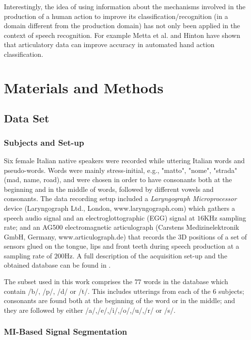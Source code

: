 \documentclass[10pt]{article}
\begin{document}
Interestingly, the idea of using information about the mechanisms involved in the production of a human action to improve its classification/recognition (in a domain different from the production domain) has not only been applied in the context of speech recognition. For example Metta et al. \cite{metta-06} and Hinton \cite{hinton-2006} 
have shown that articulatory data can improve accuracy in automated hand action classification.

\section*{Materials and Methods}\label{sec:methods}

\subsection*{Data Set}
\label{sec:dataset}

\subsubsection*{Subjects and Set-up}
\label{subsec:setup}

Six female Italian native speakers were recorded while uttering
Italian words and pseudo-words. Words were mainly stress-initial, e.g.,
"matto", "nome", "strada" (mad, name, road), and were chosen in order
to have consonants both at the beginning and in the middle of
words, followed by different vowels and consonants.
The data recording setup included a \emph{Laryngograph Microprocessor}
device (Laryngograph Ltd., London, www.laryngograph.com) which gathers a speech audio
signal and an electroglottographic (EGG) signal at $16$KHz sampling
rate; and an AG500 electromagnetic articulograph (Carstens Medizinelektronik
GmbH, Germany, www.articulograph.de) that records the
3D positions of a set of sensors glued on the tongue, lips and front teeth
during speech production at a sampling rate of $200$Hz. A full description of the 
acquisition set-up and the obtained database can be found in \cite{tavella}.

The subset used in this work comprises the $77$ words in the database
which contain /b/, /p/, /d/ or /t/. This includes utterings from each of the
$6$ subjects; consonants are found both at the beginning of the word or
in the middle; and they are followed by either /a/,/e/,/i/,/o/,/u/,/r/ or /s/.


\subsubsection*{MI-Based Signal Segmentation}
\label{subsec:segm}
\end{document}
